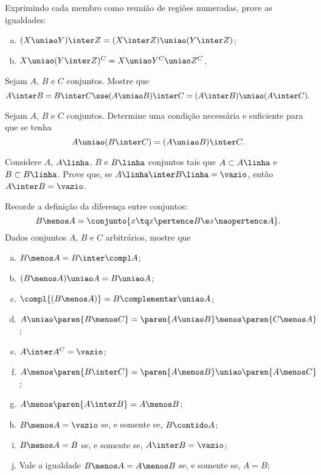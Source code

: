\begin{exercise}
  Exprimindo cada membro como reunião de regiões numeradas, prove as igualdades:
  \begin{enumerate}[a)]
    \item $(X \uniao Y) \inter Z = (X \inter Z) \uniao (Y \inter Z)$;
    \item $X \uniao (Y \inter Z )^C = X \uniao Y^C \uniao Z^C$.
  \end{enumerate}
\end{exercise}

\begin{exercise}
  Sejam $A$, $B$ e $C$ conjuntos. Mostre que 
  $$A \inter B = B \inter C \sse (A \uniao B) \inter C =(A \inter B) \uniao (A \inter C). $$
\end{exercise}

\begin{exercise}
  Sejam $A$, $B$ e $C$ conjuntos. Determine uma condição necessária e suficiente para que se tenha 
  \[
    A \uniao (B \inter C) = (A \uniao B) \inter C.
  \]
\end{exercise}

\begin{exercise}
  Considere $A$, $A\linha$, $B$ e $B\linha$ conjuntos tais que $A  \subset A\linha$ e 
  $B \subset B\linha$. Prove que, se $A\linha \inter B\linha=\vazio$, então
  $A\inter B = \vazio$.  
\end{exercise}

\begin{exercise}
  Recorde a definição da diferença entre conjuntos:
  \[
    B \menos A = \conjunto{ x \tq x \pertence B \e x \naopertence A}.
  \]
  Dados conjuntos $A$, $B$ e $C$ arbitrários, mostre que
  \begin{enumerate}[a)]
    \item $B \menos A = B \inter \compl A$;
    \item $(B \menos A) \uniao A = B \uniao A$;
    \item $\compl{(B \menos A)} = B\complementar \uniao A$;
    \item $A \uniao \paren{ B \menos C } = \paren{A \uniao B } \menos \paren{C \menos A }$;
    \item $A \inter A^C = \vazio$;
    \item $A \menos \paren{B \inter C } = \paren{A \menos B } \uniao \paren{A \menos C }$;
    \item $A \menos \paren{ A \inter B } = A \menos B$;
    \item $B \menos A = \vazio$ se, e somente se, $B \contido A$;
    \item $B \menos A = B$ se, e somente se, $A \inter B = \vazio$;
    \item Vale a igualdade $B \menos A = A \menos B$ se, e somente se, $A = B$;
  \end{enumerate}
\end{exercise}

